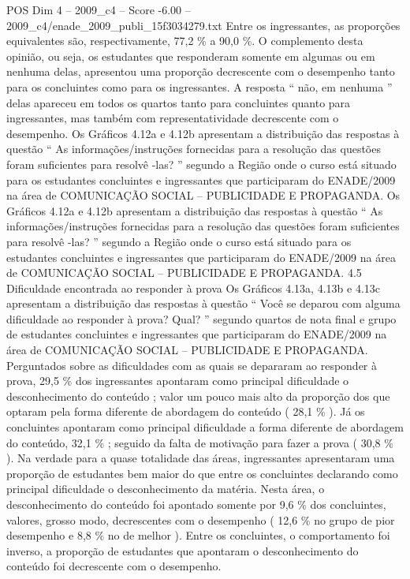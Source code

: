 \begin{textsample}{POS Dim 4 – 2009\_c4 – Score -6.00 – 2009\_c4/enade\_2009\_publi\_15f3034279.txt}
Entre os ingressantes, as proporções equivalentes são, respectivamente, 77,2 \% a 90,0 \%.
O complemento desta opinião, ou seja, os estudantes que responderam somente em algumas ou em nenhuma delas, apresentou uma proporção decrescente com o desempenho tanto para os concluintes como para os ingressantes.
A resposta “ não, em nenhuma ” delas apareceu em todos os quartos tanto para concluintes quanto para ingressantes, mas também com representatividade decrescente com o desempenho.
Os Gráficos 4.12a e 4.12b apresentam a distribuição das respostas à questão “ As informações/instruções fornecidas para a resolução das questões foram suficientes para resolvê -las? ” segundo a Região onde o curso está situado para os estudantes concluintes e ingressantes que participaram do ENADE/2009 na área de COMUNICAÇÃO SOCIAL – PUBLICIDADE E PROPAGANDA.
Os Gráficos 4.12a e 4.12b apresentam a distribuição das respostas à questão “ As informações/instruções fornecidas para a resolução das questões foram suficientes para resolvê -las? ” segundo a Região onde o curso está situado para os estudantes concluintes e ingressantes que participaram do ENADE/2009 na área de COMUNICAÇÃO SOCIAL – PUBLICIDADE E PROPAGANDA. 4.5 Dificuldade encontrada ao responder à prova Os Gráficos 4.13a, 4.13b e 4.13c apresentam a distribuição das respostas à questão “ Você se deparou com alguma dificuldade ao responder à prova?
Qual? ” segundo quartos de nota final e grupo de estudantes concluintes e ingressantes que participaram do ENADE/2009 na área de COMUNICAÇÃO SOCIAL – PUBLICIDADE E PROPAGANDA.
Perguntados sobre as dificuldades com as quais se depararam ao responder à prova, 29,5 \% dos ingressantes apontaram como principal dificuldade o desconhecimento do conteúdo ; valor um pouco mais alto da proporção dos que optaram pela forma diferente de abordagem do conteúdo ( 28,1 \% ).
Já os concluintes apontaram como principal dificuldade a forma diferente de abordagem do conteúdo, 32,1 \% ; seguido da falta de motivação para fazer a prova ( 30,8 \% ).
Na verdade para a quase totalidade das áreas, ingressantes apresentaram uma proporção de estudantes bem maior do que entre os concluintes declarando como principal dificuldade o desconhecimento da matéria.
Nesta área, o desconhecimento do conteúdo foi apontado somente por 9,6 \% dos concluintes, valores, grosso modo, decrescentes com o desempenho ( 12,6 \% no grupo de pior desempenho e 8,8 \% no de melhor ).
Entre os concluintes, o comportamento foi inverso, a proporção de estudantes que apontaram o desconhecimento do conteúdo foi decrescente com o desempenho.

\end{textsample}

